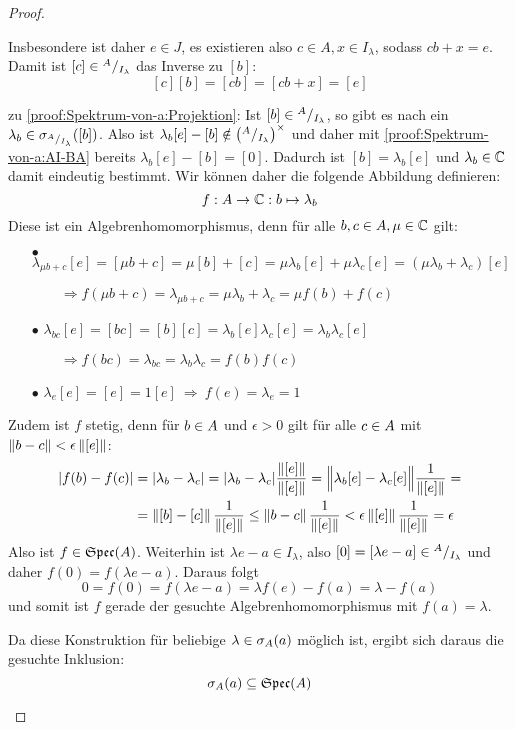 \begin{proof}
\begin{itemize}
Insbesondere ist daher $e \in J$, es existieren also $c \in A, x \in I_\lambda$, sodass $cb + x = e$. Damit ist $[c] \in {}^A/_{I_\lambda}$ das Inverse zu $[b]$:
	\[[c][b] = [cb] = [cb + x] = [e]\]

zu \ref{proof:Spektrum-von-a:Projektion}:
Ist $[b] \in {}^A/_{I_\lambda}$, so gibt es nach  ein $\lambda_b \in \sigma_{^A/_{I_\lambda}}([b])$. Also ist $\lambda_b[e] - [b] \notin \left({}^A/_{I_\lambda}\right)^\times$ und daher mit \ref{proof:Spektrum-von-a:AI-BA} bereits $\lambda_b[e] - [b] = [0]$. Dadurch ist $[b] = \lambda_b[e]$ und $\lambda_b \in \mathbb{C}$ damit eindeutig bestimmt. Wir können daher die folgende Abbildung definieren:
	\[f: A \to \mathbb{C}: b \mapsto \lambda_b\]
Diese ist ein Algebrenhomomorphismus, denn für alle $b,c \in A, \mu \in \mathbb{C}$ gilt:
\begin{itemize}
	\item[$\bullet$] 
		$\lambda_{\mu b+c}[e] = [\mu b+c] = \mu[b]+[c] = \mu\lambda_b[e] + \mu\lambda_c[e] = (\mu\lambda_b +\lambda_c)[e]$
	
			$\qquad \Rightarrow f(\mu b + c) = \lambda_{\mu b+c} = \mu\lambda_b +\lambda_c  = \mu f(b) + f(c)$
	\item[$\bullet$]
		 $\lambda_{bc}[e] = [bc] = [b][c] = \lambda_b[e]\lambda_c[e] = \lambda_b\lambda_c[e]$
	
			$\qquad \Rightarrow f(bc) = \lambda_{bc} = \lambda_b\lambda_c  = f(b)f(c)$
	\item[$\bullet$]
		 $\lambda_e[e] = [e] = 1[e] ~ \Rightarrow ~ f(e) = \lambda_e = 1$
\end{itemize}
Zudem ist $f$ stetig, denn für $b \in A$ und $\epsilon > 0$ gilt für alle $c \in A$ mit $\left\lVert b-c\right\rVert < \epsilon\left\lVert[e]\right\rVert$:
	\begin{align*}
		|f(b)-f(c)| &= |\lambda_b - \lambda_c| = |\lambda_b - \lambda_c|\frac{\left\lVert[e]\right\rVert}{\left\lVert[e]\right\rVert} = \Big\lVert\lambda_b[e] - \lambda_c[e]\Big\rVert\frac{1}{\left\lVert[e]\right\rVert}  = \\
					&= \left\lVert[b]-[c]\right\rVert\frac{1}{\left\lVert[e]\right\rVert} \leq \left\lVert b-c\right\rVert\frac{1}{\left\lVert[e]\right\rVert} < \epsilon\left\lVert[e]\right\rVert\frac{1}{\left\lVert[e]\right\rVert} = \epsilon
	\end{align*}	
Also ist $f \in \mathfrak{Spec}(A)$. Weiterhin ist $\lambda e - a \in I_\lambda$, also $[0] = [\lambda e - a] \in {}^A/_{I_\lambda}$ und daher $f(0) = f(\lambda e - a)$. Daraus folgt
	\[0 = f(0) = f(\lambda e - a) = \lambda f(e) - f(a) = \lambda - f(a)\]
und somit ist $f$ gerade der gesuchte Algebrenhomomorphismus mit $f(a) = \lambda$.

Da diese Konstruktion für beliebige $\lambda \in \sigma_A(a)$ möglich ist, ergibt sich daraus die gesuchte Inklusion:
	\[\sigma_A(a) \subseteq \mathfrak{Spec}(A) \qedhere\]
\end{itemize}
\end{proof}

